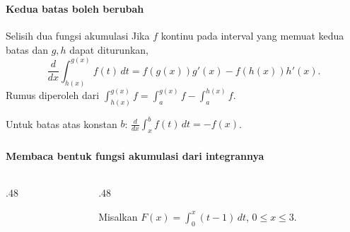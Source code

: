 \documentclass{../../kalkulus-ppt}
\begin{document}
\begin{frame}
\frametitle{\insertsection}
\framesubtitle{Kedua batas boleh berubah}

\begin{block}{Selisih dua fungsi akumulasi}
Jika $f$ kontinu pada interval yang memuat kedua batas dan $g,h$ dapat diturunkan,
\[\frac{d}{dx}\int_{h(x)}^{g(x)}f(t)\,dt
=f(g(x))g'(x)-f(h(x))h'(x).\]
Rumus diperoleh dari $\int_{h(x)}^{g(x)}f=\int_a^{g(x)}f-\int_a^{h(x)}f$.
\end{block}
Untuk batas atas konstan $b$: $\frac{d}{dx}\int_x^b f(t)\,dt=-f(x)$.
\end{frame}

\begin{frame}
\frametitle{\insertsection}
\framesubtitle{Membaca bentuk fungsi akumulasi dari integrannya}
\begin{columns}[c]
\begin{column}{.48\textwidth}
\centering{}\par

\end{column}
\begin{column}{.48\textwidth}

\begin{contoh}
Misalkan $\displaystyle F(x)=\int_0^x(t-1)\,dt$, $0\le x\le3$.
\end{contoh}
\end{column}
\end{columns}
\end{frame}
\end{document}
